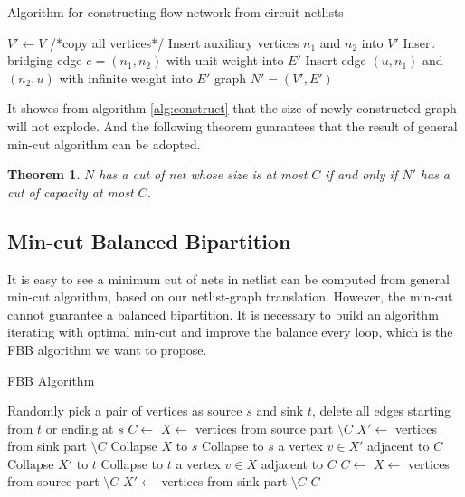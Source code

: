 \documentclass[conference,10pt]{IEEEtran}
\newtheorem{Theorem}{Theorem}[section]
\begin{document}
\begin{algorithm}[hbt]
\caption{Algorithm for constructing flow network from circuit netlists}
\label{alg:construct}
\begin{algorithmic}[1]
  \State $V'\gets V$   /*copy all vertices*/
  	\State Insert auxiliary vertices $n_1$ and $n_2$ into $V'$
  	\State Insert bridging edge $e = (n_1,n_2)$ with unit weight into $E'$
  		\State Insert edge $(u,n_1)$ and $(n_2,u)$ with infinite weight into $E'$
  	\EndFor
  \EndFor
  \State \Return graph $N' = (V',E')$
\EndFunction
\end{algorithmic}
\end{algorithm}

It showes from algorithm \ref{alg:construct} that the size of newly constructed graph will not explode.
And the following theorem guarantees that the result of general min-cut algorithm can be adopted.

\begin{Theorem}
$N$ has a cut of net whose size is at most $C$ if and only if $N'$ has a cut of capacity at most $C$.
\end{Theorem}

\subsection{Min-cut Balanced Bipartition}
It is easy to see a minimum cut of nets in netlist can be computed from general min-cut algorithm, based on
our netlist-graph translation. However, the min-cut cannot guarantee a balanced bipartition. It is necessary
to build an algorithm iterating with optimal min-cut and improve the balance every loop, which is the FBB algorithm we want to propose.

\begin{algorithm}
\caption{FBB Algorithm}
\label{alg:FBB}
\begin{algorithmic}[1]
  \State Randomly pick a pair of vertices as source $s$ and sink $t$, delete all edges starting from $t$ or
  ending at $s$
  \State $C \gets $
  \State $X\gets$ vertices from source part $\setminus C$
  \State $X'\gets$ vertices from sink part $\setminus C$
  		\State Collapse $X$ to $s$
  		\State Collapse to $s$ a vertex $v\in X'$ adjacent to $C$
  	\Else
  		\State Collapse $X'$ to $t$
  		\State Collapse to $t$ a vertex $v\in X$ adjacent to $C$
  	\EndIf
    \State $C \gets $
  \State $X\gets$ vertices from source part $\setminus C$
  \State $X'\gets$ vertices from sink part $\setminus C$
  \EndWhile
  \State \Return $C$
\EndFunction
\end{algorithmic}
\end{algorithm}
\end{document}
